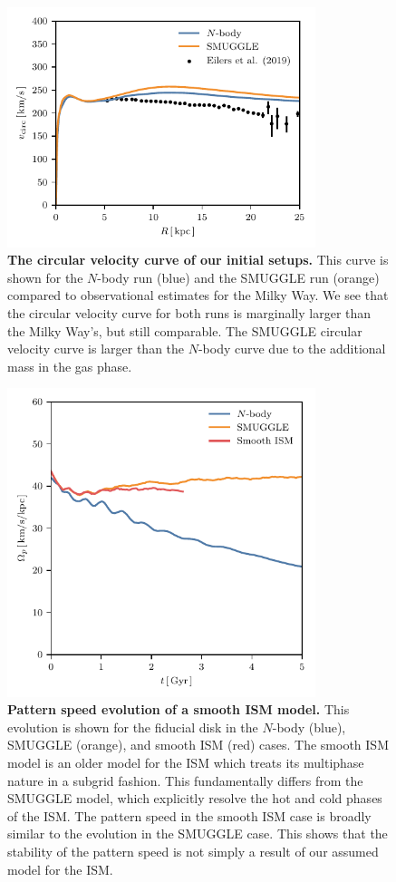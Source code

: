 \documentclass[twoside]{natureprintstyle}
\newcommand{\Nbody}{$N$-body}
\begin{document}
\begin{figure}[t]%
\centering
\includegraphics[width=9cm]{fig/vcirc.pdf}
\caption{\textbf{The circular velocity curve of our initial setups.} This
curve is shown for the \Nbody{} run (blue) and the SMUGGLE run (orange)
compared to observational estimates for the Milky
Way.\cite{2019ApJ...871..120E} We see that the circular velocity curve for
both runs is marginally larger than the Milky Way's, but still comparable. The
SMUGGLE circular velocity curve is larger than the \Nbody{} curve due to the
additional mass in the gas phase.}
\label{fig:vcirc}
\end{figure}

\begin{figure}[h!]%
\centering
\includegraphics[width=9cm]{fig/ps_GFM.pdf}
\caption{\textbf{Pattern speed evolution of a smooth ISM model.} This
evolution is shown for the fiducial disk in the \Nbody{} (blue), SMUGGLE
(orange), and smooth ISM (red) cases. The smooth ISM model is an older model
for the ISM which treats its multiphase nature in a subgrid
fashion.\cite{2003MNRAS.339..289S} This fundamentally differs from the SMUGGLE
model, which explicitly resolve the hot and cold phases of the
ISM.\cite{2019MNRAS.489.4233M} The pattern speed in the smooth ISM case is
broadly similar to the evolution in the SMUGGLE case. This shows that the
stability of the pattern speed is not simply a result of our assumed model for
the ISM.}
\label{fig:GFM}
\end{figure}
\end{document}
